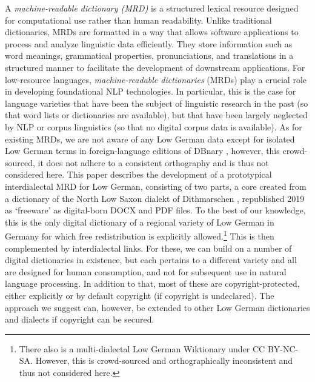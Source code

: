 A \emph{machine-readable dictionary (MRD)} is a structured lexical resource designed for computational use rather than human readability. Unlike traditional dictionaries, MRDs are formatted in a way that allows software applications to process and analyze linguistic data efficiently. They store information such as word meanings, grammatical properties, pronunciations, and translations in a structured manner to facilitate the development of downstream applications. For low-resource languages, \emph{machine-readable dictionaries} (MRDs) play a crucial role in developing foundational NLP technologies. In particular, this is the case for language varieties that have been the subject of linguistic research in the past (so that word lists or dictionaries are available), but that have been largely neglected by NLP or corpus linguistics (so that no digital corpus data is available). 
As for existing MRDs, we are not aware of any Low German data except for isolated Low German terms in foreign-language editions of DBnary \cite{serasset2014dbnary}, however, this crowd-sourced, it does not adhere to a consistent orthography and is thus not considered here.
This paper describes the development of a prototypical interdialectal MRD for Low German, consisting of two parts, a core created from a dictionary of the North Low Saxon dialekt of Dithmarschen \cite[further WöWö]{neuber-2001-woerner-woer}, republished 2019 as  `freeware' as digital-born DOCX and PDF files. To the best of our knowledge, this is the only digital dictionary of a regional variety of Low German in Germany for which free redistribution is explicitly allowed.\footnote{
    There also is a multi-dialectal Low German Wiktionary under CC BY-NC-SA. However, this is crowd-sourced and orthographically inconsistent and thus not considered here. 
}
This is then complemented by interdialectal links. For these, we can build on a number of digital dictionaries in existence, but each pertains to a different variety and all are designed for human consumption, and not for subsequent use in natural language processing. In addition to that, most of these are copyright-protected, either explicitly or by default copyright (if copyright is undeclared). The approach we suggest can, however, be extended to other Low German dictionaries and dialects if copyright can be secured.
    
